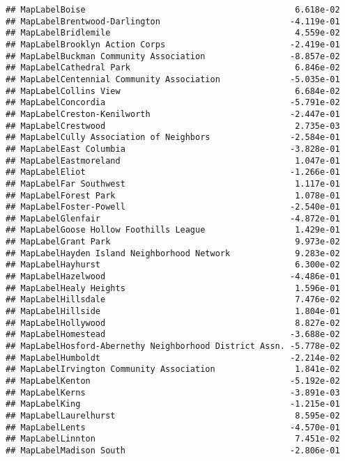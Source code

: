 \documentclass[]{article}
\begin{document}
\begin{verbatim}
## MapLabelBoise                                          6.618e-02
## MapLabelBrentwood-Darlington                          -4.119e-01
## MapLabelBridlemile                                     4.559e-02
## MapLabelBrooklyn Action Corps                         -2.419e-01
## MapLabelBuckman Community Association                 -8.857e-02
## MapLabelCathedral Park                                 6.846e-02
## MapLabelCentennial Community Association              -5.035e-01
## MapLabelCollins View                                   6.684e-02
## MapLabelConcordia                                     -5.791e-02
## MapLabelCreston-Kenilworth                            -2.447e-01
## MapLabelCrestwood                                      2.735e-03
## MapLabelCully Association of Neighbors                -2.584e-01
## MapLabelEast Columbia                                 -3.828e-01
## MapLabelEastmoreland                                   1.047e-01
## MapLabelEliot                                         -1.266e-01
## MapLabelFar Southwest                                  1.117e-01
## MapLabelForest Park                                    1.078e-01
## MapLabelFoster-Powell                                 -2.540e-01
## MapLabelGlenfair                                      -4.872e-01
## MapLabelGoose Hollow Foothills League                  1.429e-01
## MapLabelGrant Park                                     9.973e-02
## MapLabelHayden Island Neighborhood Network             9.283e-02
## MapLabelHayhurst                                       6.300e-02
## MapLabelHazelwood                                     -4.486e-01
## MapLabelHealy Heights                                  1.596e-01
## MapLabelHillsdale                                      7.476e-02
## MapLabelHillside                                       1.804e-01
## MapLabelHollywood                                      8.827e-02
## MapLabelHomestead                                     -3.688e-02
## MapLabelHosford-Abernethy Neighborhood District Assn. -5.778e-02
## MapLabelHumboldt                                      -2.214e-02
## MapLabelIrvington Community Association                1.841e-02
## MapLabelKenton                                        -5.192e-02
## MapLabelKerns                                         -3.891e-03
## MapLabelKing                                          -1.215e-01
## MapLabelLaurelhurst                                    8.595e-02
## MapLabelLents                                         -4.570e-01
## MapLabelLinnton                                        7.451e-02
## MapLabelMadison South                                 -2.806e-01

\end{verbatim}
\end{document}

